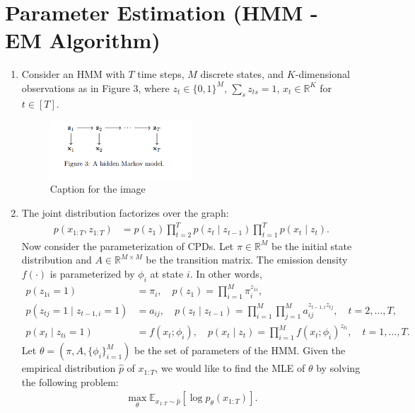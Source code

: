 \documentclass[a3paper,12pt]{extarticle} %
\begin{document}
\section{Parameter Estimation (HMM - EM Algorithm)}
\begin{enumerate}
    \item Consider an HMM with $T$ time steps, $M$ discrete states, and $K$-dimensional observations as in Figure 3, where $z_t \in \{0, 1\}^M$, $\sum_{s} z_{ts} = 1$, $x_t \in \mathbb{R}^K$ for $t \in [T]$.
    \begin{figure}[h!]
        \centering
        \includegraphics[width=0.5\textwidth]{hmm.png}
        \caption{Caption for the image}
        \label{fig:example_image}
    \end{figure}
\item The joint distribution factorizes over the graph:
\begin{align}
    p(x_{1:T}, z_{1:T}) &= p(z_1) \prod_{t=2}^{T} p(z_t \mid z_{t-1}) \prod_{t=1}^{T} p(x_t \mid z_t). \tag{4}
\end{align}
Now consider the parameterization of CPDs. Let $\pi \in \mathbb{R}^M$ be the initial state distribution and $A \in \mathbb{R}^{M \times M}$ be the transition matrix. The emission density $f(\cdot)$ is parameterized by $\phi_i$ at state $i$. In other words,
\begin{align}
    p(z_{1i} = 1) &= \pi_i, \quad p(z_1) = \prod_{i=1}^{M} \pi_i^{z_{1i}}, \tag{5} \\
    p(z_{tj} = 1 \mid z_{t-1,i} = 1) &= a_{ij}, \quad p(z_t \mid z_{t-1}) = \prod_{i=1}^{M} \prod_{j=1}^{M} a_{ij}^{z_{t-1,i} z_{tj}}, \quad t = 2, \ldots, T, \tag{6} \\
    p(x_t \mid z_{ti} = 1) &= f(x_t; \phi_i), \quad p(x_t \mid z_t) = \prod_{i=1}^{M} f(x_t; \phi_i)^{z_{ti}}, \quad t = 1, \ldots, T. \tag{7}
\end{align}
Let $\theta = (\pi, A, \{\phi_i\}_{i=1}^{M})$ be the set of parameters of the HMM. Given the empirical distribution $\hat{p}$ of $x_{1:T}$, we would like to find the MLE of $\theta$ by solving the following problem:
\begin{align}
    \max_{\theta} \mathbb{E}_{x_{1:T} \sim \hat{p}} [\log p_{\theta}(x_{1:T})]. \tag{8}

\end{align}
\end{enumerate}
\end{document}
